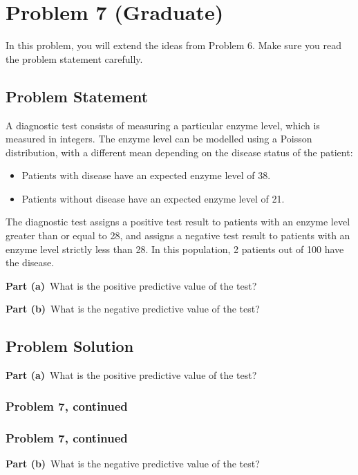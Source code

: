 \documentclass[12pt]{article}
\theoremstyle{definition}
\begin{document}
\newpage
\section*{Problem 7 (Graduate)}

In this problem, you will extend the ideas from Problem 6. Make sure you read the problem statement carefully.

\subsection*{Problem Statement}

A diagnostic test consists of measuring a particular enzyme level, which is measured in integers. The enzyme level can be modelled using a Poisson distribution, with a different mean depending on the disease status of the patient:
\begin{itemize}
	\item Patients with disease have an expected enzyme level of 38.
	\item Patients without disease have an expected enzyme level of 21.
\end{itemize}
The diagnostic test assigns a positive test result to patients with an enzyme level greater than or equal to 28, and assigns a negative test result to patients with an enzyme level strictly less than 28. In this population, 2 patients out of 100 have the disease.

\bigskip
\noindent
{\bf Part (a)}\ What is the positive predictive value of the test?

\bigskip
\noindent
{\bf Part (b)}\ What is the negative predictive value of the test?

\subsection*{Problem Solution}

\bigskip
\noindent
{\bf Part (a)}\ What is the positive predictive value of the test?


\newpage
\subsubsection*{Problem 7, continued}

\newpage
\subsubsection*{Problem 7, continued}

\noindent
{\bf Part (b)}\ What is the negative predictive value of the test?
\end{document}
